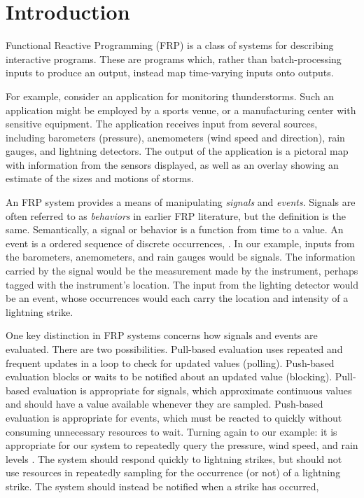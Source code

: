 \section{Introduction}
\label{section:Introduction}

Functional Reactive Programming (FRP) is a class of systems for describing
interactive programs. These are programs which, rather than batch-processing
inputs to produce an output, instead map time-varying inputs onto outputs.

For example, consider an application for monitoring thunderstorms. Such an
application might be employed by a sports venue, or a manufacturing center with
sensitive equipment. The application receives input from several sources,
including barometers (pressure), anemometers (wind speed and direction), rain
gauges, and lightning detectors. The output of the application is a pictoral map
with information from the sensors displayed, as well as an overlay showing an
estimate of the sizes and motions of storms.

An FRP system provides a means of manipulating {\em signals} and
{\em events}. Signals are often referred to as {\em behaviors} in earlier FRP literature,
but the definition is the same.  Semantically, a signal or behavior is a
function from time to a value. An event is a ordered sequence of discrete
occurrences, . In our example, inputs from
the barometers, anemometers, and rain gauges would be signals. The
information carried by the signal would be the measurement made by the
instrument, perhaps tagged with the instrument's location. The input from the
lighting detector would be an event, whose occurrences would each carry the
location and intensity of a lightning strike.

One key distinction in FRP systems concerns how signals and events are
evaluated. There are two possibilities. Pull-based evaluation uses repeated and
frequent updates in a loop to check for updated values (polling).
Push-based
evaluation blocks or waits to be notified about an updated value (blocking).
Pull-based evaluation is appropriate for signals,
which approximate continuous values and should have a value available whenever
they are sampled. Push-based evaluation is appropriate for events, which must be
reacted to quickly without consuming unnecessary resources to wait. Turning
again to our example: it is appropriate for our system to repeatedly query the
pressure, wind speed, and rain levels . The system should respond quickly to
lightning strikes, but should not use resources in repeatedly sampling for the
occurrence (or not) of a lightning strike.  The system should instead be notified
when a strike has occurred, 

